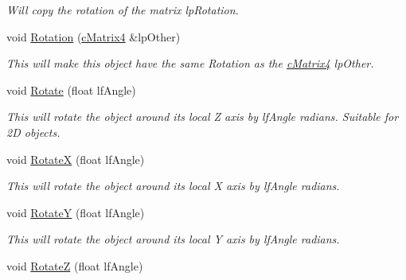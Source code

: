 \begin{DoxyCompactItemize}
\begin{DoxyCompactList}\small\item\em Will copy the rotation of the matrix lpRotation. \end{DoxyCompactList}\item 
\hypertarget{classc_matrix4_aa3eadfc363f0d3696e8f9468ccd3782b}{
void \hyperlink{classc_matrix4_aa3eadfc363f0d3696e8f9468ccd3782b}{Rotation} (\hyperlink{classc_matrix4}{cMatrix4} \&lpOther)}
\label{classc_matrix4_aa3eadfc363f0d3696e8f9468ccd3782b}

\begin{DoxyCompactList}\small\item\em This will make this object have the same Rotation as the \hyperlink{classc_matrix4}{cMatrix4} lpOther. \end{DoxyCompactList}\item 
\hypertarget{classc_matrix4_ab21d0553250b8ca4b0388105afc79478}{
void \hyperlink{classc_matrix4_ab21d0553250b8ca4b0388105afc79478}{Rotate} (float lfAngle)}
\label{classc_matrix4_ab21d0553250b8ca4b0388105afc79478}

\begin{DoxyCompactList}\small\item\em This will rotate the object around its local Z axis by lfAngle radians. Suitable for 2D objects. \end{DoxyCompactList}\item 
\hypertarget{classc_matrix4_af3c238c3d65276912b3071c33c9a8e59}{
void \hyperlink{classc_matrix4_af3c238c3d65276912b3071c33c9a8e59}{RotateX} (float lfAngle)}
\label{classc_matrix4_af3c238c3d65276912b3071c33c9a8e59}

\begin{DoxyCompactList}\small\item\em This will rotate the object around its local X axis by lfAngle radians. \end{DoxyCompactList}\item 
\hypertarget{classc_matrix4_ac625c531c3644462cc91ed53bef5e1e9}{
void \hyperlink{classc_matrix4_ac625c531c3644462cc91ed53bef5e1e9}{RotateY} (float lfAngle)}
\label{classc_matrix4_ac625c531c3644462cc91ed53bef5e1e9}

\begin{DoxyCompactList}\small\item\em This will rotate the object around its local Y axis by lfAngle radians. \end{DoxyCompactList}\item 
\hypertarget{classc_matrix4_a784f4dd7106e393b654d17ff78cc49a7}{
void \hyperlink{classc_matrix4_a784f4dd7106e393b654d17ff78cc49a7}{RotateZ} (float lfAngle)}
\label{classc_matrix4_a784f4dd7106e393b654d17ff78cc49a7}


\end{DoxyCompactItemize}
